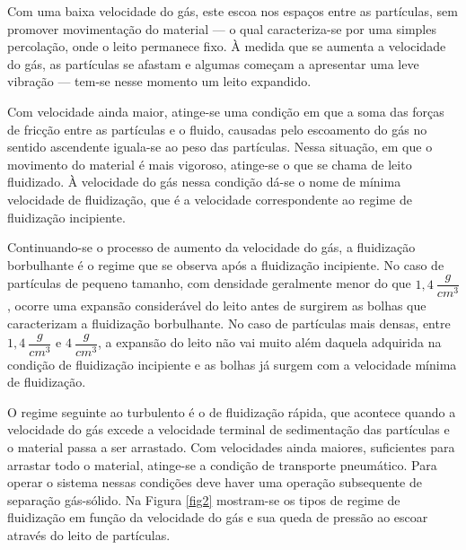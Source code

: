 Com uma baixa velocidade do gás, este escoa nos espaços entre as partículas, sem promover movimentação do material — o qual caracteriza-se por uma simples percolação, onde o leito permanece fixo. À medida que se aumenta a velocidade do gás, as partículas se afastam e algumas começam a apresentar uma leve vibração — tem-se nesse momento um leito expandido.

Com velocidade ainda maior, atinge-se uma condição em que a soma das forças de fricção entre as partículas e o fluido, causadas pelo escoamento do gás no sentido ascendente iguala-se ao peso das partículas. Nessa situação, em que o movimento do material é mais vigoroso, atinge-se o que se chama de leito fluidizado. À velocidade do gás nessa condição dá-se o nome de mínima velocidade de fluidização, que é a velocidade correspondente ao regime de fluidização incipiente.

Continuando-se o processo de aumento da velocidade do gás, a fluidização borbulhante é o regime que se observa após a fluidização incipiente. No caso de partículas de pequeno tamanho, com densidade geralmente menor do que $ 1,4 \ \dfrac{g}{cm^{3}} $, ocorre uma expansão considerável do leito antes de surgirem as bolhas que caracterizam a fluidização borbulhante. No caso de partículas mais densas, entre $ 1,4 \ \dfrac{g}{cm^{3}} $ e $ 4 \ \dfrac{g}{cm^{3}} $, a expansão do leito não vai muito além daquela adquirida na condição de fluidização incipiente e as bolhas já surgem com a velocidade mínima de fluidização.

O regime seguinte ao turbulento é o de fluidização rápida, que acontece quando a velocidade do gás excede a velocidade terminal de sedimentação das partículas e o material passa a ser arrastado. Com velocidades ainda maiores, suficientes para arrastar todo o material, atinge-se a condição de transporte pneumático. Para operar o sistema nessas condições deve haver uma operação subsequente de separação gás-sólido. Na Figura \ref{fig2} mostram-se os tipos de regime de fluidização em função da velocidade do gás e sua queda de pressão ao escoar através do leito de partículas.

